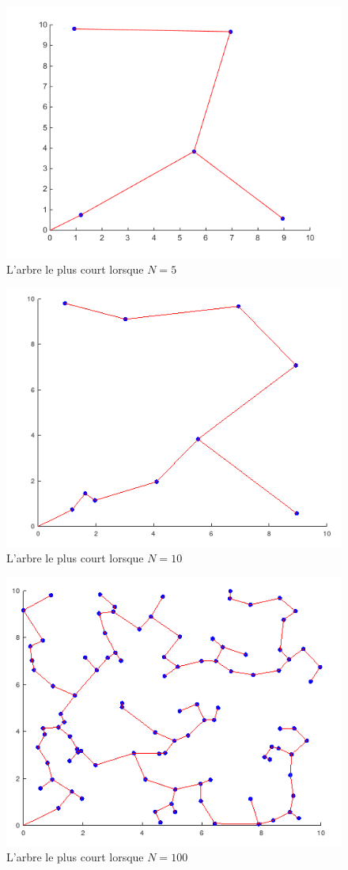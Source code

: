 \documentclass[10pt,a4paper]{article}
\begin{document}
\begin{figure}[!ht]
    \centering
    \includegraphics[width=0.8\linewidth]{img/n=5_maxX=10_maxY=10.png}
    \caption{L'arbre le plus court lorsque $N=5$}
    \label{L'arbre le plus court lorsque $N=5$}
\end{figure}

\begin{figure}[!ht]
    \centering
    \includegraphics[width=0.8\linewidth]{img/n=10_maxX=10_maxY=10.png}
    \caption{L'arbre le plus court lorsque $N=10$}
    \label{L'arbre le plus court lorsque $N=10$}
\end{figure}

\begin{figure}[!ht]
    \centering
    \includegraphics[width=0.8\linewidth]{img/n=100_maxX=10_maxY=10.png}
    \caption{L'arbre le plus court lorsque $N=100$}
    \label{L'arbre le plus court lorsque $N=100$}
\end{figure}
\end{document}

